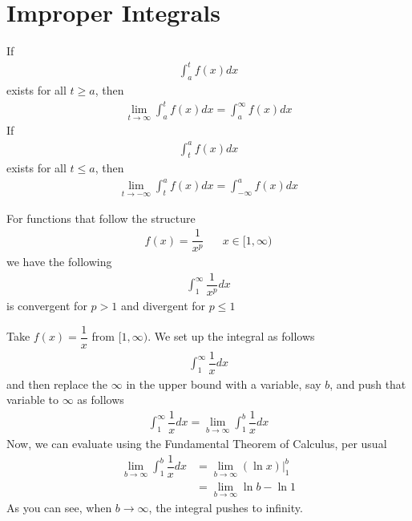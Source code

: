 \section{Improper Integrals}

\begin{definition}
If
\begin{align*}
    \int_{a}^{t} f(x) dx
\end{align*}
exists for all $t \geq a$, then 
\begin{align*}
    \lim_{t \longrightarrow \infty} \int_{a}^{t} f(x) dx = \int_{a}^{\infty} f(x) dx
\end{align*}
If
\begin{align*}
    \int_{t}^{a} f(x) dx
\end{align*}
exists for all $t \leq a$, then 
\begin{align*}
    \lim_{t \longrightarrow -\infty} \int_{t}^{a} f(x) dx = \int_{-\infty}^{a} f(x) dx
\end{align*}
\end{definition}

\begin{theorem}
For functions that follow the structure
\begin{align*}
    f(x) = \dfrac{1}{x^{p}} \hspace{20pt} x \in [1, \infty)
\end{align*}
we have the following
\begin{align*}
    \int_{1}^{\infty} \dfrac{1}{x^{p}} dx
\end{align*}
is convergent for $p > 1$ and divergent for $p \leq 1$
\end{theorem}

\begin{example}
Take $f(x) = \dfrac{1}{x}$ from $[1, \infty)$. We set up the integral as follows
\begin{align*}
    \int_{1}^{\infty} \dfrac{1}{x} dx
\end{align*}
and then replace the $\infty$ in the upper bound with a variable, say $b$, and push that variable to $\infty$ as follows
\begin{align*}
    \int_{1}^{\infty} \dfrac{1}{x} dx = \lim_{b \longrightarrow \infty} \int_{1}^{b} \dfrac{1}{x} dx
\end{align*}
Now, we can evaluate using the Fundamental Theorem of Calculus, per usual
\begin{align*}
    \lim_{b \longrightarrow \infty} \int_{1}^{b} \dfrac{1}{x} dx &= \lim_{b \longrightarrow \infty} (\ln x) \Big|_{1}^{b}\\[2ex]
    &= \lim_{b \longrightarrow \infty} \ln b - \ln 1 
\end{align*}
As you can see, when $b \longrightarrow \infty$, the integral pushes to infinity. 
\end{example}

